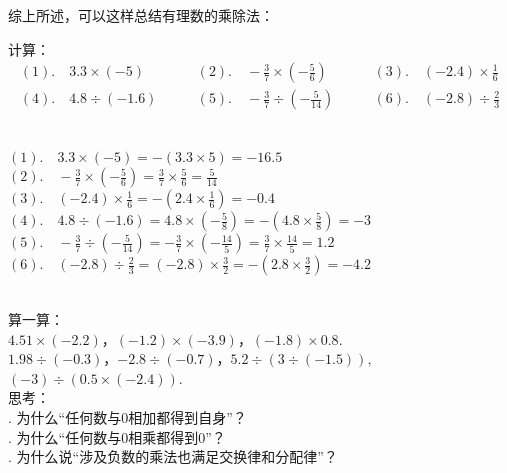 \documentclass[12pt,UTF8,fontset=none]{ctexbook}
\begin{document}
综上所述，可以这样总结有理数的乘除法：
\begin{center}
\end{center}
\begin{ex}
    计算：
    $$
    \begin{array}{lll}
        (1). \quad 3.3 \times (-5) \quad & \quad (2). \quad -\frac{3}{7} \times (- \frac{5}{6}) \quad & \quad (3). \quad (-2.4) \times \frac{1}{6} \\
        (4). \quad 4.8 \div (-1.6) \quad & \quad (5). \quad -\frac{3}{7} \div (- \frac{5}{14}) \quad & \quad (6). \quad (-2.8) \div \frac{2}{3}
    \end{array}
    $$
\end{ex}
\begin{so}
    \mbox{}\\
    \indent $(1). \quad 3.3 \times (-5) = -(3.3 \times 5) = -16.5$ \\
    \indent $(2). \quad -\frac{3}{7} \times (- \frac{5}{6}) = \frac{3}{7} \times \frac{5}{6} = \frac{5}{14}$ \\
    \indent $(3). \quad (-2.4) \times \frac{1}{6} = -(2.4 \times \frac{1}{6}) = -0.4$ \\
    \indent $(4). \quad 4.8 \div (-1.6) =  4.8 \times (-\frac{5}{8}) = -(4.8 \times \frac{5}{8}) = -3$ \\
    \indent $(5). \quad -\frac{3}{7} \div (- \frac{5}{14}) = -\frac{3}{7} \times (- \frac{14}{5}) = \frac{3}{7} \times \frac{14}{5} = 1.2$ \\
    \indent $(6). \quad (-2.8) \div \frac{2}{3} = (-2.8) \times \frac{3}{2} = -(2.8 \times \frac{3}{2}) = -4.2 $ 
\end{so}

\begin{xt}\label{xt:3-1-0}
    \mbox{}\\
    \indent 算一算：\\
    \indent $4.51 \times (-2.2)$，$(-1.2) \times (-3.9)$，$(-1.8)\times 0.8.$ \\
    \indent $1.98 \div (-0.3)$，$-2.8 \div (-0.7)$，$5.2 \div (3 \div (-1.5))$, $(-3) \div (0.5 \times (-2.4)).$ \\
    \indent 思考：\\
    . 为什么“任何数与$0$相加都得到自身”？\\
    . 为什么“任何数与$0$相乘都得到$0$”？\\
    . 为什么说“涉及负数的乘法也满足交换律和分配律”？
\end{xt}
\end{document}

